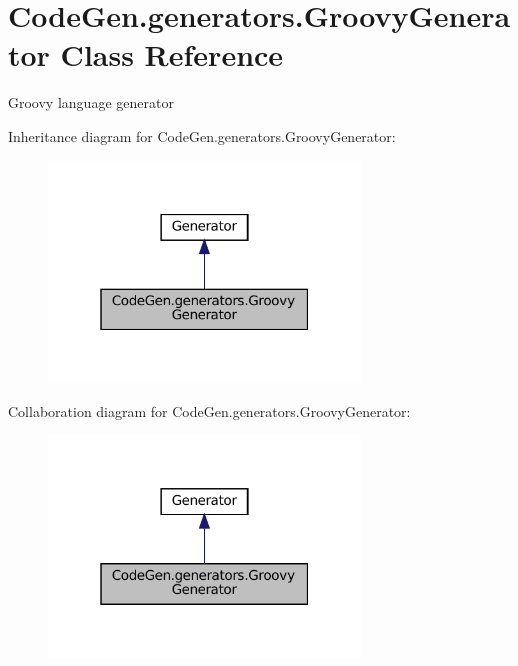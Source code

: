 \hypertarget{classCodeGen_1_1generators_1_1GroovyGenerator}{}\section{Code\+Gen.\+generators.\+Groovy\+Generator Class Reference}
\label{classCodeGen_1_1generators_1_1GroovyGenerator}


Groovy language generator  




Inheritance diagram for Code\+Gen.\+generators.\+Groovy\+Generator\+:
\nopagebreak
\begin{figure}[H]
\begin{center}
\leavevmode
\includegraphics[width=235pt]{classCodeGen_1_1generators_1_1GroovyGenerator__inherit__graph}
\end{center}
\end{figure}


Collaboration diagram for Code\+Gen.\+generators.\+Groovy\+Generator\+:
\nopagebreak
\begin{figure}[H]
\begin{center}
\leavevmode
\includegraphics[width=235pt]{classCodeGen_1_1generators_1_1GroovyGenerator__coll__graph}
\end{center}
\end{figure}
